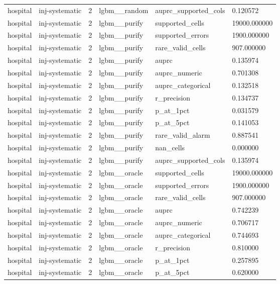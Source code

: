 \begin{tabular}{llllll}
hospital & inj-systematic & 2 & lgbm\_\_random & auprc\_supported\_cols & 0.120572 \\
hospital & inj-systematic & 2 & lgbm\_\_purify & supported\_cells & 19000.000000 \\
hospital & inj-systematic & 2 & lgbm\_\_purify & supported\_errors & 1900.000000 \\
hospital & inj-systematic & 2 & lgbm\_\_purify & rare\_valid\_cells & 907.000000 \\
hospital & inj-systematic & 2 & lgbm\_\_purify & auprc & 0.135974 \\
hospital & inj-systematic & 2 & lgbm\_\_purify & auprc\_numeric & 0.701308 \\
hospital & inj-systematic & 2 & lgbm\_\_purify & auprc\_categorical & 0.132518 \\
hospital & inj-systematic & 2 & lgbm\_\_purify & r\_precision & 0.134737 \\
hospital & inj-systematic & 2 & lgbm\_\_purify & p\_at\_1pct & 0.031579 \\
hospital & inj-systematic & 2 & lgbm\_\_purify & p\_at\_5pct & 0.141053 \\
hospital & inj-systematic & 2 & lgbm\_\_purify & rare\_valid\_alarm & 0.887541 \\
hospital & inj-systematic & 2 & lgbm\_\_purify & nan\_cells & 0.000000 \\
hospital & inj-systematic & 2 & lgbm\_\_purify & auprc\_supported\_cols & 0.135974 \\
hospital & inj-systematic & 2 & lgbm\_\_oracle & supported\_cells & 19000.000000 \\
hospital & inj-systematic & 2 & lgbm\_\_oracle & supported\_errors & 1900.000000 \\
hospital & inj-systematic & 2 & lgbm\_\_oracle & rare\_valid\_cells & 907.000000 \\
hospital & inj-systematic & 2 & lgbm\_\_oracle & auprc & 0.742239 \\
hospital & inj-systematic & 2 & lgbm\_\_oracle & auprc\_numeric & 0.706717 \\
hospital & inj-systematic & 2 & lgbm\_\_oracle & auprc\_categorical & 0.744693 \\
hospital & inj-systematic & 2 & lgbm\_\_oracle & r\_precision & 0.810000 \\
hospital & inj-systematic & 2 & lgbm\_\_oracle & p\_at\_1pct & 0.257895 \\
hospital & inj-systematic & 2 & lgbm\_\_oracle & p\_at\_5pct & 0.620000 \\

\end{tabular}

